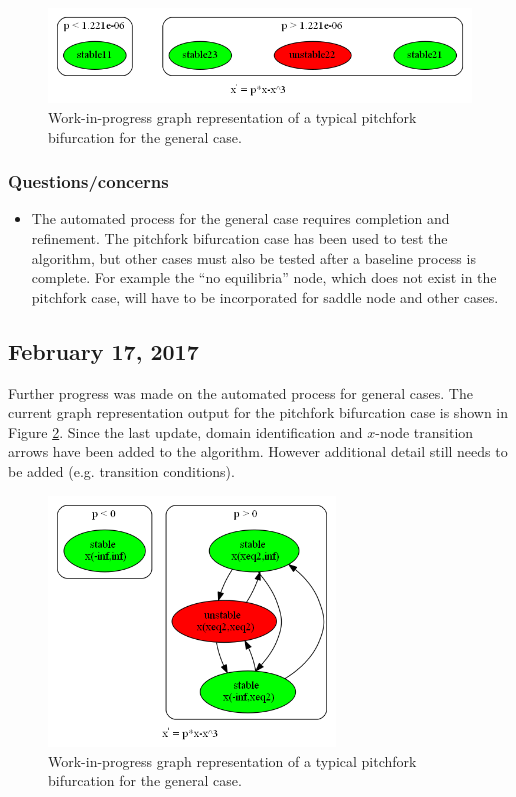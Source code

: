 \documentclass[12pt]{article}
\begin{document}
\begin{figure}[H]
\begin{center}
\includegraphics[width=5in]{feb10_graph_pf1.png}
\caption{Work-in-progress graph representation of a typical pitchfork bifurcation for the general case.}
\label{feb10_graph_pf1}
\end{center}
\end{figure}

\subsubsection{Questions/concerns}
\begin{itemize}
\item The automated process for the general case requires completion and refinement. The pitchfork bifurcation case has been used to test the algorithm, but other cases must also be tested after a baseline process is complete. For example the ``no equilibria'' node, which does not exist in the pitchfork case, will have to be incorporated for saddle node and other cases.
\end{itemize}


\subsection{February 17, 2017}
Further progress was made on the automated process for general cases. The current graph representation output for the pitchfork bifurcation case is shown in Figure \ref{feb17_graph_pf1}. Since the last update, domain identification and $x$-node transition arrows have been added to the algorithm. However additional detail still needs to be added (e.g. transition conditions). 

\begin{figure}[H]
\begin{center}
\includegraphics[width=3in]{feb17_graph_pf1.png}
\caption{Work-in-progress graph representation of a typical pitchfork bifurcation for the general case.}
\label{feb17_graph_pf1}
\end{center}
\end{figure}
\end{document}
